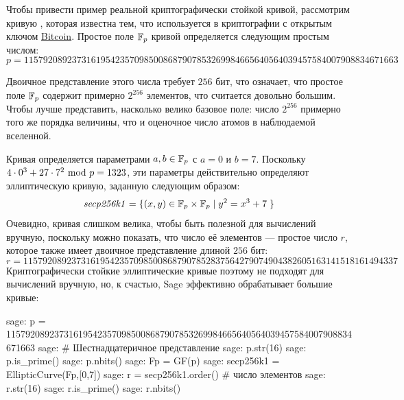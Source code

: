 \begin{example}\label{secp256k1}
Чтобы привести пример реальной криптографически стойкой кривой, рассмотрим кривую , которая известна тем, что используется в криптографии с открытым ключом \href{https://bitcoin.org/}{Bitcoin}. Простое поле $\mathbb{F}_p$ кривой  определяется следующим простым числом:
$$
p = \scriptstyle 115792089237316195423570985008687907853269984665640564039457584007908834671663
$$
 
 Двоичное представление этого числа требует $256$ бит, что означает, что простое поле $\mathbb{F}_p$ содержит примерно $2^{256}$ элементов, что считается довольно большим. Чтобы лучше представить, насколько велико базовое поле: число $2^{256}$ примерно того же порядка величины, что и оценочное число атомов в наблюдаемой вселенной. 

Кривая  определяется параметрами $a,b\in \mathbb{F}_p$ с $a=0$ и $b=7$. Поскольку $4\cdot 0^3 + 27\cdot 7^2 \text{ mod } p=1323$, эти параметры действительно определяют эллиптическую кривую, заданную следующим образом:
$$
\mathit{secp256k1} = \{(x,y)\in \mathbb{F}_p\times \mathbb{F}_p \;|\; y^2 = x^3 +7\;\} 
$$
Очевидно, кривая  слишком велика, чтобы быть полезной для вычислений вручную, поскольку можно показать, что число её элементов — простое число $r$, которое также имеет двоичное представление длиной $256$ бит:
$$
r = \scriptstyle 11579208923731619542357098500868790785283756427907490438260516
3141518161494337
$$
Криптографически стойкие эллиптические кривые поэтому не подходят для вычислений вручную, но, к счастью, Sage эффективно обрабатывает большие кривые:
\begin{sagecommandline}
sage: p = 115792089237316195423570985008687907853269984665640564039457584007908834671663
sage: # Шестнадцатеричное представление
sage: p.str(16)
sage: p.is_prime()
sage: p.nbits()
sage: Fp = GF(p)
sage: secp256k1 = EllipticCurve(Fp,[0,7])
sage: r = secp256k1.order() # число элементов
sage: r.str(16)
sage: r.is_prime()
sage: r.nbits()
\end{sagecommandline}
\end{example}
